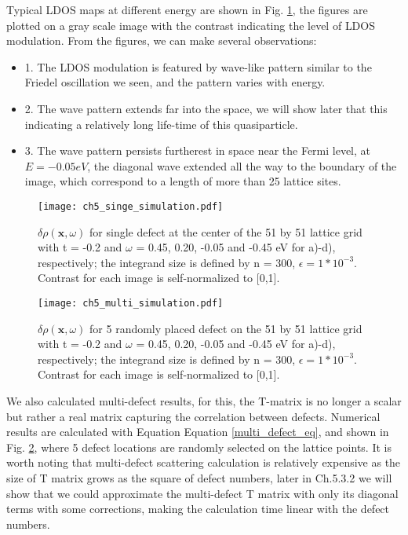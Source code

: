 Typical \ac{LDOS} maps at different energy are shown in Fig. \ref{fig:ch5_single_scattering}, the figures are plotted on a gray scale image with the contrast indicating the level of \ac{LDOS} modulation. From the figures, we can make several observations:
\begin{itemize}
	\item 1. The \ac{LDOS} modulation is featured by wave-like pattern similar to the Friedel oscillation we seen, and the pattern varies with energy. 
	\item 2. The wave pattern extends far into the space, we will show later that this indicating a relatively long life-time of this quasiparticle. 
	\item 3. The wave pattern persists furtherest in space near the Fermi level, at $E=-0.05eV$, the diagonal wave extended all the way to the boundary of the image, which correspond to a length of more than 25 lattice sites. 
\end{itemize}

\begin{figure}
	\centering
	\texttt{[image: ch5\_singe\_simulation.pdf]} %
	\caption{$\delta\rho(\textbf{x},\omega)$ for single defect at the center of the 51 by 51 lattice grid with t = -0.2 and $\omega$ = 0.45, 0.20, -0.05 and -0.45 eV for a)-d), respectively; the integrand size is defined by n = 300, $\epsilon = 1*10^{-3}$. Contrast for each image is self-normalized to [0,1].}
	\label{fig:ch5_single_scattering}
\end{figure}

\begin{figure}
	\centering
	\texttt{[image: ch5\_multi\_simulation.pdf]} 
	\caption{$\delta\rho(\textbf{x},\omega)$ for 5 randomly placed defect on the 51 by 51 lattice grid with t = -0.2 and $\omega$ = 0.45, 0.20, -0.05 and -0.45 eV for a)-d), respectively; the integrand size is defined by n = 300, $\epsilon = 1*10^{-3}$. Contrast for each image is self-normalized to [0,1].}
	\label{fig:ch5_multi_scattering}
\end{figure}

We also calculated multi-defect results, for this, the T-matrix is no longer a scalar but rather a real matrix capturing the correlation between defects. Numerical results are calculated with Equation Equation \ref{multi_defect_eq}, and shown in Fig. \ref{fig:ch5_multi_scattering}, where 5 defect locations are randomly selected on the lattice points. It is worth noting that multi-defect scattering calculation is relatively expensive as the size of T matrix grows as the square of defect numbers, later in Ch.5.3.2 we will show that we could approximate the multi-defect T matrix with only its diagonal terms with some corrections, making the calculation time linear with the defect numbers.  


